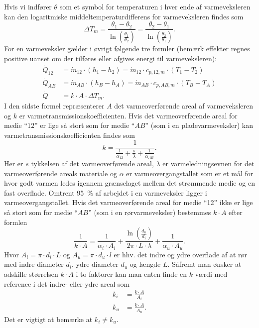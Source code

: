 Hvis vi indfører $\theta$ som et symbol for temperaturen i hver ende af varmeveksleren kan den logaritmiske middeltemperaturdifferens for varmeveksleren findes som
\[ 
\Delta T_{m} = \frac{\theta_1 - \theta_2}{\ln \left( \frac{\theta_1}{\theta_2} \right)} = \frac{\theta_2 - \theta_1}{\ln \left( \frac{\theta_2}{\theta_1} \right)}
.\]
For en varmeveksler gælder i øvrigt følgende tre formler (bemærk effekter regnes positive uanset om der tilføres eller afgives energi til varmeveksleren):
\begin{align*}
  \dot{Q}_{12} &= \dot{m}_{12} \cdot \left( h_1 - h_2 \right) = \dot{m}_{12} \cdot c_{p, 12, m} \cdot \left( T_1 - T_2 \right) \\
  \dot{Q}_{AB} &= \dot{m}_{AB} \cdot \left( h_B - h_A \right) = \dot{m}_{AB} \cdot c_{p, AB, m} \cdot \left( T_B - T_A \right)\\
  \dot{Q} &= k \cdot A\cdot \Delta T_m
.\end{align*}
I den sidste formel repræsenterer $A$ det varmeoverførende areal af varmeveksleren og $k$ er varmetransmissionskoefficienten. Hvis det varmeoverførende areal for medie ``$12$'' er lige så stort som for medie ``$AB$'' (som i en pladevarmeveksler) kan varmetransmissionskoefficienten findes som
\[ 
  k = \frac{1}{\frac{1}{\alpha_{12}} + \frac{s}{\lambda} + \frac{1}{\alpha_{AB}}}
.\]
Her er $s$ tykkelsen af det varmeoverførende areal, $\lambda$ er varmeledningsevnen for det varmeoverførende areals materiale og $\alpha$ er varmeovergangstallet som er et mål for hvor godt varmen ledes igennem grænselaget mellem det strømmende medie og en fast overflade. Omtrent 95 \% af arbejdet i en varmeveksler ligger i varmeovergangstallet. Hvis det varmeoverførende areal for medie ``12'' ikke er lige så stort som for medie ``$AB$'' (som i en rørvarmeveksler) bestemmes $k \cdot A$ efter formlen
\[ 
\frac{1}{k \cdot A} = \frac{1}{\alpha_i \cdot A_i} + \frac{\ln \left( \frac{d_u}{d_i} \right)}{2 \pi \cdot L \cdot \lambda} + \frac{1}{\alpha_u \cdot A_u}
.\]
Hvor $A_i = \pi \cdot d_i \cdot L$ og $A_u = \pi \cdot d_u \cdot l$ er hhv. det indre og ydre overflade af at rør med indre diameter $d_i$, ydre diameter $d_u$ og længde $L$. Såfremt man ønsker at adskille størrelsen $k \cdot A$ i to faktorer kan man enten finde en $k$-værdi med reference i det indre- eller ydre areal som
\begin{align*}
  k_i &= \frac{k\cdot A}{A_i} \\
  k_u &= \frac{k \cdot A}{A_u}
.\end{align*}
Det er vigtigt at bemærke at $k_i \neq k_u$.


